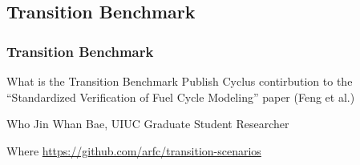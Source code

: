 \subsection{Transition Benchmark}
\begin{frame}
  \frametitle{Transition Benchmark}
\begin{block}{What is the Transition Benchmark}
        Publish Cyclus contirbution to the ``Standardized Verification of Fuel 
        Cycle Modeling'' paper (Feng et al.)
\end{block}

\begin{block}{Who}
Jin Whan Bae, UIUC Graduate Student Researcher
\end{block}

\begin{block}{Where}
        \url{https://github.com/arfc/transition-scenarios} 

\end{block}

\end{frame}

